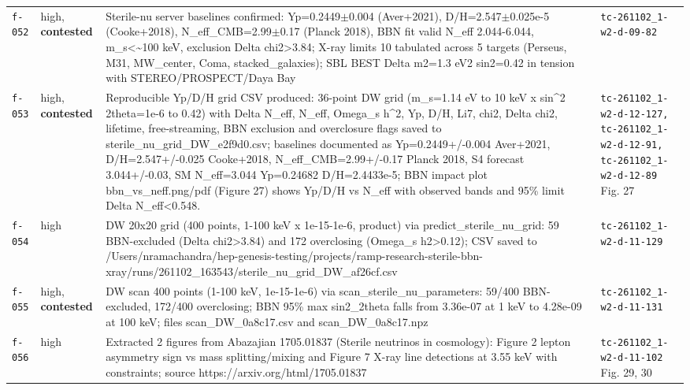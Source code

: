\documentclass[11pt,a4paper]{article}
\begin{document}
\begin{longtable}{@{}p{}p{}p{}p{}@{}}
\texttt{f-052} & high, \textbf{contested} & Sterile-nu server baselines confirmed: Yp=0.2449$\pm$0.004 (Aver+2021), D/H=2.547$\pm$0.025e-5 (Cooke+2018), N\_eff\_CMB=2.99$\pm$0.17 (Planck 2018), BBN fit valid N\_eff 2.044-6.044, m\_s\textless{}\textasciitilde{}100 keV, exclusion Delta chi2\textgreater{}3.84; X-ray limits 10 tabulated across 5 targets (Perseus, M31, MW\_center, Coma, stacked\_galaxies); SBL BEST Delta m2=1.3 eV2 sin2=0.42 in tension with STEREO/PROSPECT/Daya Bay & \texttt{tc-261102\_\allowbreak{}1-w2-d-09-82} \\
\texttt{f-053} & high, \textbf{contested} & Reproducible Yp/D/H grid CSV produced: 36-point DW grid (m\_s=1.14 eV to 10 keV x sin\textasciicircum{}2 2theta=1e-6 to 0.42) with Delta N\_eff, N\_eff, Omega\_s h\textasciicircum{}2, Yp, D/H, Li7, chi2, Delta chi2, lifetime, free-streaming, BBN exclusion and overclosure flags saved to sterile\_nu\_grid\_DW\_e2f9d0.csv; baselines documented as Yp=0.2449+/-0.004 Aver+2021, D/H=2.547+/-0.025 Cooke+2018, N\_eff\_CMB=2.99+/-0.17 Planck 2018, S4 forecast 3.044+/-0.03, SM N\_eff=3.044 Yp=0.24682 D/H=2.4433e-5; BBN impact plot bbn\_vs\_neff.png/pdf (Figure 27) shows Yp/D/H vs N\_eff with observed bands and 95\% limit Delta N\_eff\textless{}0.548. & \texttt{tc-261102\_\allowbreak{}1-w2-d-12-127,\allowbreak{} tc-261102\_\allowbreak{}1-w2-d-12-91,\allowbreak{} tc-261102\_\allowbreak{}1-w2-d-12-89} Fig. 27 \\
\texttt{f-054} & high & DW 20x20 grid (400 points, 1-100 keV x 1e-15-1e-6, product) via predict\_sterile\_nu\_grid: 59 BBN-excluded (Delta chi2\textgreater{}3.84) and 172 overclosing (Omega\_s h2\textgreater{}0.12); CSV saved to /Users/nramachandra/hep-genesis-testing/projects/ramp-research-sterile-bbn-xray/runs/261102\_163543/sterile\_nu\_grid\_DW\_af26cf.csv & \texttt{tc-261102\_\allowbreak{}1-w2-d-11-129} \\
\texttt{f-055} & high, \textbf{contested} & DW scan 400 points (1-100 keV, 1e-15-1e-6) via scan\_sterile\_nu\_parameters: 59/400 BBN-excluded, 172/400 overclosing; BBN 95\% max sin2\_2theta falls from 3.36e-07 at 1 keV to 4.28e-09 at 100 keV; files scan\_DW\_0a8c17.csv and scan\_DW\_0a8c17.npz & \texttt{tc-261102\_\allowbreak{}1-w2-d-11-131} \\
\texttt{f-056} & high & Extracted 2 figures from Abazajian 1705.01837 (Sterile neutrinos in cosmology): Figure 2 lepton asymmetry sign vs mass splitting/mixing and Figure 7 X-ray line detections at 3.55 keV with constraints; source https://arxiv.org/html/1705.01837 & \texttt{tc-261102\_\allowbreak{}1-w2-d-11-102} Fig. 29, 30 \\

\end{longtable}
\end{document}
